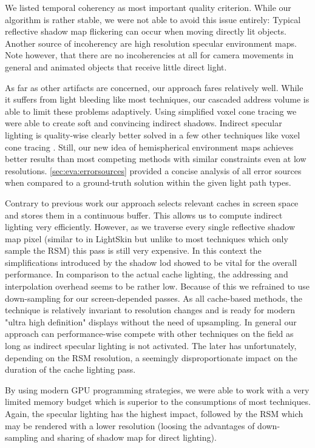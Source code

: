 \documentclass[thesis.tex]{subfiles}
\begin{document}
We listed temporal coherency as most important quality criterion.
While our algorithm is rather stable, we were not able to avoid this issue entirely:
Typical reflective shadow map flickering can occur when moving directly lit objects.
Another source of incoherency are high resolution specular environment maps.
Note however, that there are no incoherencies at all for camera movements in general and animated objects that receive little direct light.

As far as other artifacts are concerned, our approach fares relatively well.
While it suffers from light bleeding like most techniques, our cascaded address volume is able to limit these problems adaptively.
Using simplified voxel cone tracing we were able to create soft and convincing indirect shadows.
Indirect specular lighting is quality-wise clearly better solved in a few other techniques like voxel cone tracing \cite{bib:voxelconetracing}.
Still, our new idea of hemispherical environment maps achieves better results than most competing methods with similar constraints even at low resolutions.
\autoref{sec:eva:errorsources} provided a concise analysis of all error sources when compared to a ground-truth solution within the given light path types.

Contrary to previous work our approach selects relevant caches in screen space and stores them in a continuous buffer.
This allows us to compute indirect lighting very efficiently.
However, as we traverse every single reflective shadow map pixel (similar to in LightSkin \cite{bib:LightskinPaper} but unlike to most techniques which only sample the RSM) this pass is still very expensive.
In this context the simplifications introduced by the shadow lod showed to be vital for the overall performance.
In comparison to the actual cache lighting, the addressing and interpolation overhead seems to be rather low.
Because of this we refrained to use down-sampling for our screen-depended passes.
As all cache-based methods, the technique is relatively invariant to resolution changes and is ready for modern "ultra  high definition" displays without the need of upsampling.
In general our approach can performance-wise compete with other techniques on the field as long as indirect specular lighting is not activated.
The later has unfortunately, depending on the RSM resolution, a seemingly disproportionate impact on the duration of the cache lighting pass.

By using modern GPU programming strategies, we were able to work with a very limited memory budget which is superior to the consumptions of most techniques.
Again, the specular lighting has the highest impact, followed by the RSM which may be rendered with a lower resolution (loosing the advantages of down-sampling and sharing of shadow map for direct lighting).
\end{document}
